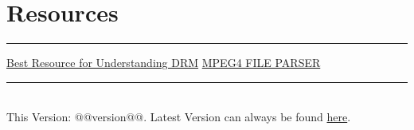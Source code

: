 \section{Resources}
\hrule

\medskip

\href{https://ottverse.com/eme-cenc-cdm-aes-keys-drm-digital-rights-management/}{Best Resource for Understanding DRM}
\href{http://mp4parser.com}{MPEG4 FILE PARSER}
\vfill
\hrule
~\\
This Version: @@version@@.  Latest Version can always be found \href{https://github.com/robert-will-brown/video-tech-cheatsheet}{here}.
